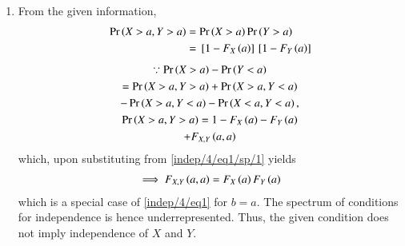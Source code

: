 \begin{enumerate}
     \item  From the given information, 
     \begin{align}
        \Pr\left(X>a,Y>a\right) &=         \Pr\left(X>a\right)\Pr\left(Y>a\right)
        \\
        &= {}\left[1-F_X\left(a\right)\right]{}\left[1-F_Y\left(a\right)\right]
        \label{indep/4/eq1/sp/1}
     \end{align}
    \begin{multline}
\because \Pr\left(X>a\right)-\Pr\left(Y<a\right)\\=\Pr\left(X>a,Y>a\right)+\Pr\left(X>a,Y<a\right)\\-\Pr\left(X>a,Y<a\right)-\Pr\left(X<a,Y<a\right), 
\\
\Pr\left(X>a,Y>a\right) =         1-F_X\left(a\right)-F_Y\left(a\right)\\ +F_{X,Y}\left(a,a\right)
    \end{multline}
which, upon substituting from         \eqref{indep/4/eq1/sp/1} yields
\begin{align}
\implies F_{X,Y}\left(a,a\right)=F_X\left(a\right)F_Y\left(a\right)
\label{indep/4/eq1/sp}
\end{align}
which is a special case of \eqref{indep/4/eq1} for $b=a$.  The spectrum of conditions for independence is hence underrepresented. 
Thus, the given  condition does not imply independence of $X$ and $Y$.    
    

\end{enumerate}
